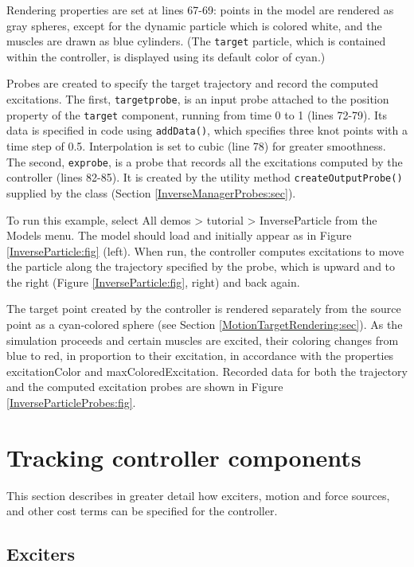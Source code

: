Rendering properties are set at lines 67-69: points in the model are rendered
as gray spheres, except for the dynamic particle which is colored white, and
the muscles are drawn as blue cylinders. (The {\tt target} particle, which is
contained within the controller, is displayed using its default color of cyan.)

Probes are created to specify the target trajectory and record the computed
excitations. The first, {\tt targetprobe}, is an input probe attached to the
{\sf position} property of the {\tt target} component, running from time 0 to 1
(lines 72-79). Its data is specified in code using {\tt addData()}, which
specifies three knot points with a time step of 0.5. Interpolation is set to
cubic (line 78) for greater smoothness. The second, {\tt exprobe}, is a probe
that records all the excitations computed by the controller (lines 82-85).  It
is created by the utility method {\tt createOutputProbe()} supplied by the
 class (Section
\ref{InverseManagerProbes:sec}).

To run this example, select {\sf All demos > tutorial > InverseParticle} from
the {\sf Models} menu. The model should load and initially appear as in
Figure \ref{InverseParticle:fig} (left). When run, the controller computes
excitations to move the particle along the trajectory specified by the probe,
which is upward and to the right (Figure \ref{InverseParticle:fig}, right) and
back again. 

The target point created by the controller is rendered separately from the
source point as a cyan-colored sphere (see
Section \ref{MotionTargetRendering:sec}). As the simulation proceeds and
certain muscles are excited, their coloring changes from blue to red, in
proportion to their excitation, in accordance with the properties {\sf
excitationColor} and {\sf maxColoredExcitation}. Recorded data for both the
trajectory and the computed excitation probes are shown in
Figure \ref{InverseParticleProbes:fig}.

\section{Tracking controller components}

This section describes in greater detail how exciters, motion and force
sources, and other cost terms can be specified for the controller.

\subsection{Exciters}
\label{Exciters:sec}

